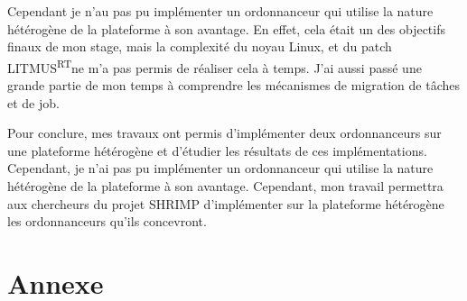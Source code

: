 \documentclass{article}
\newcommand{\litmus}{LITMUS\textsuperscript{RT}}
\begin{document}
    Cependant je n'au pas pu implémenter un ordonnanceur qui utilise la nature hétérogène de la plateforme à son avantage. En effet, cela était un des objectifs finaux de mon stage, mais la complexité du noyau Linux, et du patch \litmus ne m'a pas permis de réaliser cela à temps. J'ai aussi passé une grande partie de mon temps à comprendre les mécanismes de migration de tâches et de job.

    Pour conclure, mes travaux ont permis d'implémenter deux ordonnanceurs sur une plateforme hétérogène et d'étudier les résultats de ces implémentations. Cependant, je n'ai pas pu implémenter un ordonnanceur qui utilise la nature hétérogène de la plateforme à son avantage. Cependant, mon travail permettra aux chercheurs du projet SHRIMP d'implémenter sur la plateforme hétérogène les ordonnanceurs qu'ils concevront.
     

    \newpage

    \newpage
    \printnoidxglossaries %

    \newpage
    \listoffigures
    \lstlistoflistings



    \newpage
    \section*{Annexe}
    


    
\end{document}

